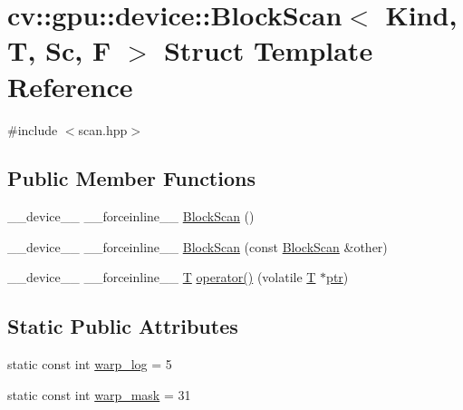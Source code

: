 \hypertarget{structcv_1_1gpu_1_1device_1_1BlockScan}{\section{cv\-:\-:gpu\-:\-:device\-:\-:Block\-Scan$<$ Kind, T, Sc, F $>$ Struct Template Reference}
\label{structcv_1_1gpu_1_1device_1_1BlockScan}
}


{\ttfamily \#include $<$scan.\-hpp$>$}

\subsection*{Public Member Functions}
\begin{DoxyCompactItemize}
\item 
\-\_\-\-\_\-device\-\_\-\-\_\- \-\_\-\-\_\-forceinline\-\_\-\-\_\- \hyperlink{structcv_1_1gpu_1_1device_1_1BlockScan_a3e923e49e2aaeeaa1190d9c620e0dbf8}{Block\-Scan} ()
\item 
\-\_\-\-\_\-device\-\_\-\-\_\- \-\_\-\-\_\-forceinline\-\_\-\-\_\- \hyperlink{structcv_1_1gpu_1_1device_1_1BlockScan_a95673e7c27e20289f2192e5cef17bfc7}{Block\-Scan} (const \hyperlink{structcv_1_1gpu_1_1device_1_1BlockScan}{Block\-Scan} \&other)
\item 
\-\_\-\-\_\-device\-\_\-\-\_\- \-\_\-\-\_\-forceinline\-\_\-\-\_\- \hyperlink{calib3d_8hpp_a3efb9551a871ddd0463079a808916717}{T} \hyperlink{structcv_1_1gpu_1_1device_1_1BlockScan_a7e3f541a1909f7da1598b24b8fe98f3f}{operator()} (volatile \hyperlink{calib3d_8hpp_a3efb9551a871ddd0463079a808916717}{T} $\ast$\hyperlink{core__c_8h_a166529da793cc1ef241cff347f3db5a5}{ptr})
\end{DoxyCompactItemize}
\subsection*{Static Public Attributes}
\begin{DoxyCompactItemize}
\item 
static const int \hyperlink{structcv_1_1gpu_1_1device_1_1BlockScan_a104541f77d6c80b161733957c37721b5}{warp\-\_\-log} = 5
\item 
static const int \hyperlink{structcv_1_1gpu_1_1device_1_1BlockScan_a098c5d001b3d26bcf2712f5cc2bbe6a8}{warp\-\_\-mask} = 31
\end{DoxyCompactItemize}


